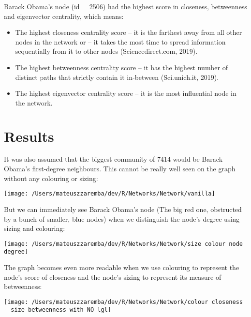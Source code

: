 \documentclass[
]{article}
\providecommand{\tightlist}{%
  \setlength{\itemsep}{0pt}\setlength{\parskip}{0pt}}
\begin{document}
Barack Obama's node (id = 2506) had the highest score in closeness,
betweenness and eigenvector centrality, which means:

\begin{itemize}
\tightlist
\item
  The highest closeness centrality score -- it is the farthest away from
  all other nodes in the network or -- it takes the most time to spread
  information sequentially from it to other nodes (Sciencedirect.com,
  2019).
\item
  The highest betweenness centrality score -- it has the highest number
  of distinct paths that strictly contain it in-between (Sci.unich.it,
  2019).
\item
  The highest eigenvector centrality score -- it is the most influential
  node in the network.
\end{itemize}

\hypertarget{results}{%
\section{Results}\label{results}}

It was also assumed that the biggest community of 7414 would be Barack
Obama's first-degree neighbours. This cannot be really well seen on the
graph without any colouring or sizing:

\begin{center}\texttt{[image: /Users/mateuszzaremba/dev/R/Networks/Network/vanilla]} \end{center}

But we can immediately see Barack Obama's node (The big red one,
obstructed by a bunch of smaller, blue nodes) when we distinguish the
node's degree using sizing and colouring:

\begin{center}\texttt{[image: /Users/mateuszzaremba/dev/R/Networks/Network/size colour node degree]} \end{center}

The graph becomes even more readable when we use colouring to represent
the node's score of closeness and the node's sizing to represent its
measure of betweenness:

\begin{center}\texttt{[image: /Users/mateuszzaremba/dev/R/Networks/Network/colour closeness - size betweenness with NO lgl]} \end{center}
\end{document}
